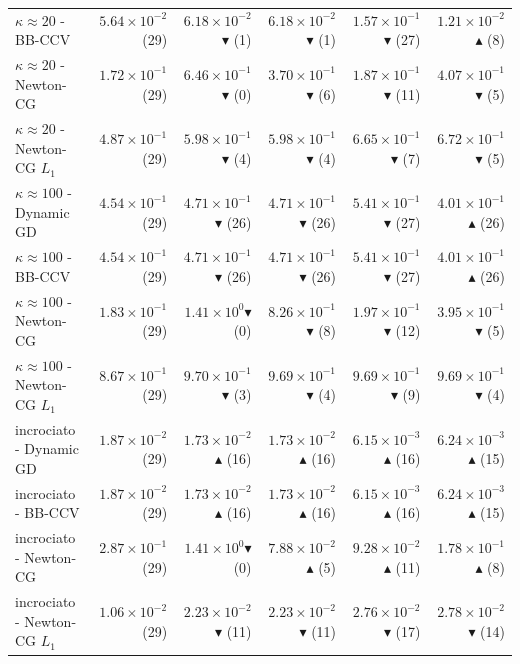 \begin{table}[H]
\begin{tabular}{@{}lrrrrr@{}}
$\kappa\approx20$ - BB-CCV & $5.64\times10^{-2}$ (29) & $6.18\times10^{-2}$$\blacktriangledown$ (1) & $6.18\times10^{-2}$$\blacktriangledown$ (1) & $1.57\times10^{-1}$$\blacktriangledown$ (27) & $1.21\times10^{-2}$$\blacktriangle$ (8)\\
$\kappa\approx20$ - Newton-CG & $1.72\times10^{-1}$ (29) & $6.46\times10^{-1}$$\blacktriangledown$ (0) & $3.70\times10^{-1}$$\blacktriangledown$ (6) & $1.87\times10^{-1}$$\blacktriangledown$ (11) & $4.07\times10^{-1}$$\blacktriangledown$ (5)\\
$\kappa\approx20$ - Newton-CG $L_1$ & $4.87\times10^{-1}$ (29) & $5.98\times10^{-1}$$\blacktriangledown$ (4) & $5.98\times10^{-1}$$\blacktriangledown$ (4) & $6.65\times10^{-1}$$\blacktriangledown$ (7) & $6.72\times10^{-1}$$\blacktriangledown$ (5)\\
\midrule
$\kappa\approx100$ - Dynamic GD & $4.54\times10^{-1}$ (29) & $4.71\times10^{-1}$$\blacktriangledown$ (26) & $4.71\times10^{-1}$$\blacktriangledown$ (26) & $5.41\times10^{-1}$$\blacktriangledown$ (27) & $4.01\times10^{-1}$$\blacktriangle$ (26)\\
$\kappa\approx100$ - BB-CCV & $4.54\times10^{-1}$ (29) & $4.71\times10^{-1}$$\blacktriangledown$ (26) & $4.71\times10^{-1}$$\blacktriangledown$ (26) & $5.41\times10^{-1}$$\blacktriangledown$ (27) & $4.01\times10^{-1}$$\blacktriangle$ (26)\\
$\kappa\approx100$ - Newton-CG & $1.83\times10^{-1}$ (29) & $1.41\times10^{0}$$\blacktriangledown$ (0) & $8.26\times10^{-1}$$\blacktriangledown$ (8) & $1.97\times10^{-1}$$\blacktriangledown$ (12) & $3.95\times10^{-1}$$\blacktriangledown$ (5)\\
$\kappa\approx100$ - Newton-CG $L_1$ & $8.67\times10^{-1}$ (29) & $9.70\times10^{-1}$$\blacktriangledown$ (3) & $9.69\times10^{-1}$$\blacktriangledown$ (4) & $9.69\times10^{-1}$$\blacktriangledown$ (9) & $9.69\times10^{-1}$$\blacktriangledown$ (4)\\
\midrule
incrociato - Dynamic GD & $1.87\times10^{-2}$ (29) & $1.73\times10^{-2}$$\blacktriangle$ (16) & $1.73\times10^{-2}$$\blacktriangle$ (16) & $6.15\times10^{-3}$$\blacktriangle$ (16) & $6.24\times10^{-3}$$\blacktriangle$ (15)\\
incrociato - BB-CCV & $1.87\times10^{-2}$ (29) & $1.73\times10^{-2}$$\blacktriangle$ (16) & $1.73\times10^{-2}$$\blacktriangle$ (16) & $6.15\times10^{-3}$$\blacktriangle$ (16) & $6.24\times10^{-3}$$\blacktriangle$ (15)\\
incrociato - Newton-CG & $2.87\times10^{-1}$ (29) & $1.41\times10^{0}$$\blacktriangledown$ (0) & $7.88\times10^{-2}$$\blacktriangle$ (5) & $9.28\times10^{-2}$$\blacktriangle$ (11) & $1.78\times10^{-1}$$\blacktriangle$ (8)\\
incrociato - Newton-CG $L_1$ & $1.06\times10^{-2}$ (29) & $2.23\times10^{-2}$$\blacktriangledown$ (11) & $2.23\times10^{-2}$$\blacktriangledown$ (11) & $2.76\times10^{-2}$$\blacktriangledown$ (17) & $2.78\times10^{-2}$$\blacktriangledown$ (14)\\
\midrule
\bottomrule
\end{tabular}
\end{table}


